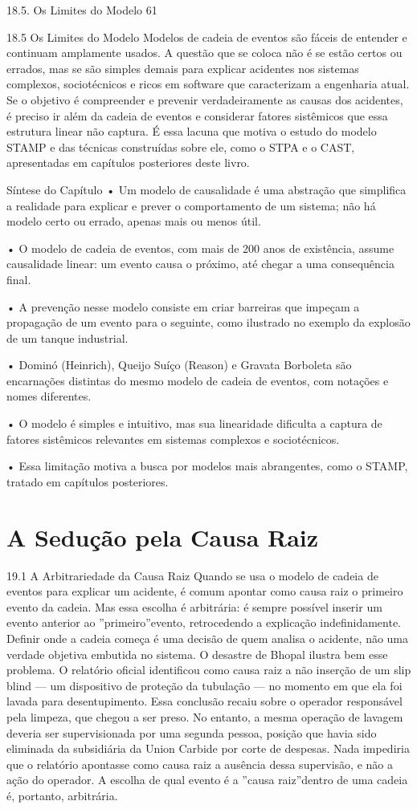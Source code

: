 18.5. Os Limites do Modelo 61

18.5 Os Limites do Modelo Modelos de cadeia de eventos são fáceis de entender e continuam amplamente usados. A questão que se coloca não é se estão certos ou errados, mas se são simples demais para explicar acidentes nos sistemas complexos, sociotécnicos e ricos em software que caracterizam a engenharia atual. Se o objetivo é compreender e prevenir verdadeiramente as causas dos acidentes, é preciso ir além da cadeia de eventos e considerar fatores sistêmicos que essa estrutura linear não captura. É essa lacuna que motiva o estudo do modelo STAMP e das técnicas construídas sobre ele, como o STPA e o CAST, apresentadas em capítulos posteriores deste livro.

Síntese do Capítulo • Um modelo de causalidade é uma abstração que simplifica a realidade para explicar e prever o comportamento de um sistema; não há modelo certo ou errado, apenas mais ou menos útil.

• O modelo de cadeia de eventos, com mais de 200 anos de existência, assume causalidade linear: um evento causa o próximo, até chegar a uma consequência final.

• A prevenção nesse modelo consiste em criar barreiras que impeçam a propagação de um evento para o seguinte, como ilustrado no exemplo da explosão de um tanque industrial.

• Dominó (Heinrich), Queijo Suíço (Reason) e Gravata Borboleta são encarnações distintas do mesmo modelo de cadeia de eventos, com notações e nomes diferentes.

• O modelo é simples e intuitivo, mas sua linearidade dificulta a captura de fatores sistêmicos relevantes em sistemas complexos e sociotécnicos.

• Essa limitação motiva a busca por modelos mais abrangentes, como o STAMP, tratado em capítulos posteriores.

\chapter{A Sedução pela Causa Raiz}

19.1 A Arbitrariedade da Causa Raiz Quando se usa o modelo de cadeia de eventos para explicar um acidente, é comum apontar como causa raiz o primeiro evento da cadeia. Mas essa escolha é arbitrária: é sempre possível inserir um evento anterior ao ”primeiro”evento, retrocedendo a explicação indefinidamente. Definir onde a cadeia começa é uma decisão de quem analisa o acidente, não uma verdade objetiva embutida no sistema. O desastre de Bhopal ilustra bem esse problema. O relatório oficial identificou como causa raiz a não inserção de um slip blind — um dispositivo de proteção da tubulação — no momento em que ela foi lavada para desentupimento. Essa conclusão recaiu sobre o operador responsável pela limpeza, que chegou a ser preso. No entanto, a mesma operação de lavagem deveria ser supervisionada por uma segunda pessoa, posição que havia sido eliminada da subsidiária da Union Carbide por corte de despesas. Nada impediria que o relatório apontasse como causa raiz a ausência dessa supervisão, e não a ação do operador. A escolha de qual evento é a ”causa raiz”dentro de uma cadeia é, portanto, arbitrária.

